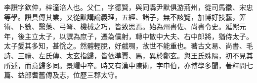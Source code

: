 \begin{pinyinscope}
 
 
 李譔字欽仲，梓潼涪人也。父仁，字德賢，與同縣尹默俱游荊州，從司馬徽、宋忠等學。譔具傳其業，又從默講論義理，五經、諸子，無不該覽，加博好技藝，筭術、卜數、醫藥、弓弩、機械之巧，皆致思焉。始為州書佐、尚書令史。延熈元年，後主立太子，以譔為庶子，遷為僕射，轉中散中大夫、右中郎將，猶侍太子。太子愛其多知，甚恱之。然體輕脫，好戲啁，故世不能重也。著古文易、尚書、毛詩、三禮、左氏傳、太玄指歸，皆依準賈、馬，異於鄭玄。與王氏殊隔，初不見其所述，而意歸多同。景耀中卒。時又有漢中陳術，字申伯，亦博學多聞，著釋問七篇、益部耆舊傳及志，位歷三郡太守。
 
 
\end{pinyinscope}